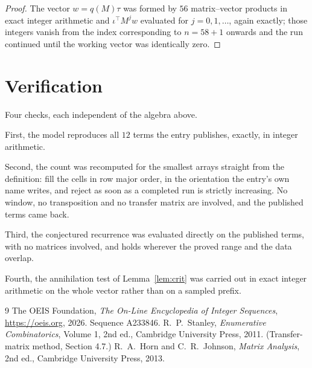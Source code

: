 \documentclass[11pt,a4paper]{article}
\theoremstyle{plain}
\theoremstyle{definition}
\begin{document}
\begin{proof}
The vector $w=q(M)\tau$ was formed by $56$ matrix--vector products in exact integer
arithmetic and $\iota^{\!\top}M^{j}w$ evaluated for $j=0,1,\dots$, again exactly; those
integers vanish from the index corresponding to $n=58+1$ onwards and the run continued
until the working vector was identically zero.
\end{proof}

\section{Verification}

Four checks, each independent of the algebra above.

First, the model reproduces all $12$ terms the entry publishes, exactly, in integer
arithmetic.

Second, the count was recomputed for the smallest arrays straight from the definition: fill the
cells in row major order, in the orientation the entry's own name writes, and reject as soon as
a completed run is strictly increasing. No window, no transposition and no transfer matrix are involved, and
the published terms came back.

Third, the conjectured recurrence was evaluated directly on the published terms, with no
matrices involved, and holds wherever the proved range and the data overlap.

Fourth, the annihilation test of Lemma~\ref{lem:crit} was carried out in exact integer
arithmetic on the whole vector rather than on a sampled prefix.

\begin{thebibliography}{9}
 The OEIS Foundation, \emph{The On-Line Encyclopedia of Integer
Sequences}, \url{https://oeis.org}, 2026. Sequence A233846.
 R.~P.~Stanley, \emph{Enumerative Combinatorics}, Volume 1, 2nd ed.,
Cambridge University Press, 2011. (Transfer-matrix method, Section 4.7.)
 R.~A.~Horn and C.~R.~Johnson, \emph{Matrix Analysis}, 2nd ed., Cambridge
University Press, 2013.
\end{thebibliography}
\end{document}
